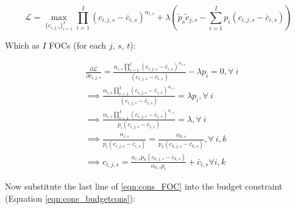 \documentclass[letterpaper,12pt]{article}
\theoremstyle{definition}
\begin{document}
\begin{spacing}{1.5}
    \begin{equation} \label{eqn:cons_lagrangian}
       \mathcal{L} =  \max_{\{c_{i,j,s}\}_{i=1}^{I}}  \prod_{i=1}^I \left( c_{i,j,s} - \bar c_{i,s} \right) ^{\alpha_{i,s}}  + \lambda \left(\tilde{p}_{s}\tilde{c}_{j,s} - \sum_{i=1}^{I} p_{i}(c_{i,j,s}-\bar{c}_{i,s})\right)
    \end{equation}
    
    Which as $I$ FOCs (for each $j$, $s$, $t$):
    
      \begin{equation} \label{eqn:cons_FOC}
      \begin{split}
       & \frac{\partial \mathcal{L}}{\partial c_{i,j,s}} = \frac{\alpha_{i,s} \prod_{i=1}^I \left( c_{i,j,s} - \bar c_{i,s} \right) ^{\alpha_{i,s}}}{(c_{i,j,s}-\bar{c}_{i,s})}-\lambda p_{i} = 0, \forall \ i  \\
       & \implies  \frac{\alpha_{i,s} \prod_{i=1}^I \left( c_{i,j,s} - \bar c_{i,s} \right) ^{\alpha_{i,s}}}{(c_{i,j,s}-\bar{c}_{i,s})} = \lambda p_{i}, \forall \ i \\
       & \implies  \frac{\alpha_{i,s} \prod_{i=1}^I \left( c_{i,j,s} - \bar c_{i,s} \right) ^{\alpha_{i,s}}}{ p_{i}(c_{i,j,s}-\bar{c}_{i,s})} = \lambda, \forall \ i \\
       & \implies \frac{\alpha_{i,s}}{p_{i}(c_{i,j,s}-\bar{c}_{i,s})}=\frac{\alpha_{k,s}}{p_{k}(c_{k,j,s}-\bar{c}_{k,s})}, \forall \ i,k \\
       & \implies c_{i,j,s}= \frac{\alpha_{i,s} p_{k}(c_{k,j,s}-\bar{c}_{k,s})}{\alpha_{k,s} p_{i}} + \bar{c}_{i,s} \forall i,k 
       \end{split}
    \end{equation}
    
    Now substitute the last line of \ref{eqn:cons_FOC} into the budget constraint (Equation \ref{eqn:cons_budgetcons}):
    

\end{spacing}
\end{document}
